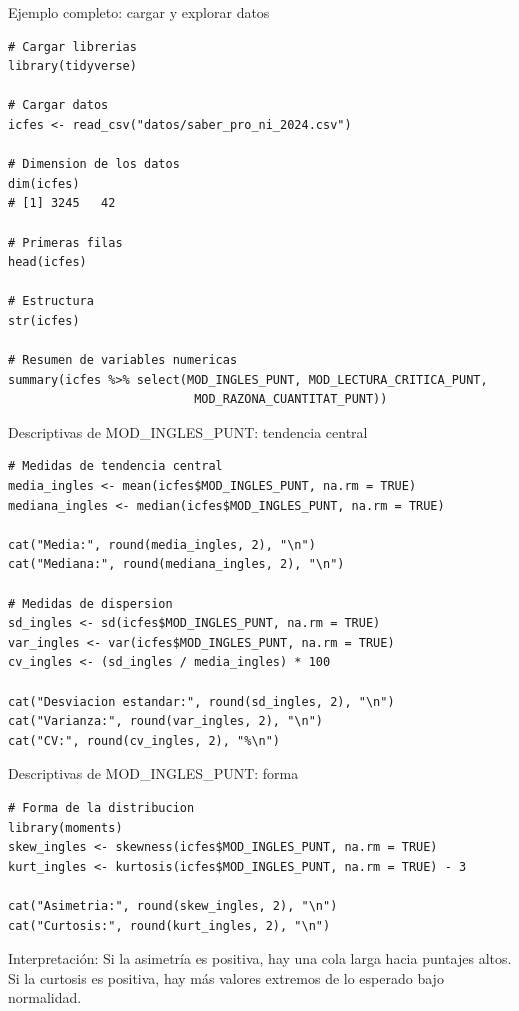 \documentclass[aspectratio=169, 11pt]{beamer}
\begin{document}
\begin{frame}[fragile]{Ejemplo completo: cargar y explorar datos}
\begin{lstlisting}[basicstyle=\ttfamily\scriptsize]
# Cargar librerias
library(tidyverse)

# Cargar datos
icfes <- read_csv("datos/saber_pro_ni_2024.csv")

# Dimension de los datos
dim(icfes)
# [1] 3245   42

# Primeras filas
head(icfes)

# Estructura
str(icfes)

# Resumen de variables numericas
summary(icfes %>% select(MOD_INGLES_PUNT, MOD_LECTURA_CRITICA_PUNT,
                          MOD_RAZONA_CUANTITAT_PUNT))
\end{lstlisting}
\end{frame}

\begin{frame}[fragile]{Descriptivas de MOD\_INGLES\_PUNT: tendencia central}
\begin{lstlisting}
# Medidas de tendencia central
media_ingles <- mean(icfes$MOD_INGLES_PUNT, na.rm = TRUE)
mediana_ingles <- median(icfes$MOD_INGLES_PUNT, na.rm = TRUE)

cat("Media:", round(media_ingles, 2), "\n")
cat("Mediana:", round(mediana_ingles, 2), "\n")

# Medidas de dispersion
sd_ingles <- sd(icfes$MOD_INGLES_PUNT, na.rm = TRUE)
var_ingles <- var(icfes$MOD_INGLES_PUNT, na.rm = TRUE)
cv_ingles <- (sd_ingles / media_ingles) * 100

cat("Desviacion estandar:", round(sd_ingles, 2), "\n")
cat("Varianza:", round(var_ingles, 2), "\n")
cat("CV:", round(cv_ingles, 2), "%\n")
\end{lstlisting}
\end{frame}

\begin{frame}[fragile]{Descriptivas de MOD\_INGLES\_PUNT: forma}
\begin{lstlisting}
# Forma de la distribucion
library(moments)
skew_ingles <- skewness(icfes$MOD_INGLES_PUNT, na.rm = TRUE)
kurt_ingles <- kurtosis(icfes$MOD_INGLES_PUNT, na.rm = TRUE) - 3

cat("Asimetria:", round(skew_ingles, 2), "\n")
cat("Curtosis:", round(kurt_ingles, 2), "\n")
\end{lstlisting}

\vspace{0.5em}
\alert{Interpretación}: Si la asimetría es positiva, hay una cola larga hacia puntajes altos. Si la curtosis es positiva, hay más valores extremos de lo esperado bajo normalidad.
\end{frame}
\end{document}

